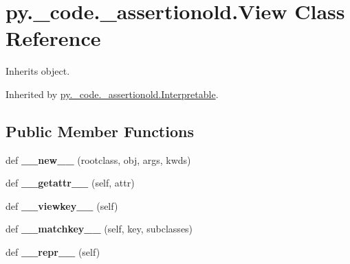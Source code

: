 \hypertarget{classpy_1_1__code_1_1__assertionold_1_1_view}{}\section{py.\+\_\+code.\+\_\+assertionold.\+View Class Reference}
\label{classpy_1_1__code_1_1__assertionold_1_1_view}


Inherits object.



Inherited by \hyperlink{classpy_1_1__code_1_1__assertionold_1_1_interpretable}{py.\+\_\+code.\+\_\+assertionold.\+Interpretable}.

\subsection*{Public Member Functions}
\begin{DoxyCompactItemize}
\item 
\mbox{\label{classpy_1_1__code_1_1__assertionold_1_1_view_a3c1f3209176ff9757d590d67bd786ed4}} 
def {\bfseries \+\_\+\+\_\+new\+\_\+\+\_\+} (rootclass, obj, args, kwds)
\item 
\mbox{\label{classpy_1_1__code_1_1__assertionold_1_1_view_a6a96838762338a829dcc776eb165762c}} 
def {\bfseries \+\_\+\+\_\+getattr\+\_\+\+\_\+} (self, attr)
\item 
\mbox{\label{classpy_1_1__code_1_1__assertionold_1_1_view_a88f5df587e34affcd5875a69f67aea8b}} 
def {\bfseries \+\_\+\+\_\+viewkey\+\_\+\+\_\+} (self)
\item 
\mbox{\label{classpy_1_1__code_1_1__assertionold_1_1_view_a01ed9a33a052bccbb86d05dee73fbff9}} 
def {\bfseries \+\_\+\+\_\+matchkey\+\_\+\+\_\+} (self, key, subclasses)
\item 
\mbox{\label{classpy_1_1__code_1_1__assertionold_1_1_view_ac5138156b02e1253d80d191de89ba2cf}} 
def {\bfseries \+\_\+\+\_\+repr\+\_\+\+\_\+} (self)
\end{DoxyCompactItemize}


